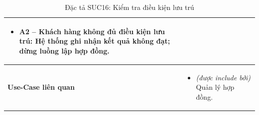 \begin{table}[H]
\begin{tabularx}{\textwidth}{|>{\centering\arraybackslash\bfseries}m{3.5cm}|X|}
\begin{itemize}[leftmargin=*, nosep, label=-]
        \item \textbf{A2 -- Khách hàng không đủ điều kiện lưu trú:} Hệ thống ghi nhận kết quả không đạt; dừng luồng lập hợp đồng.
    \end{itemize} \\
    \hline
    Use-Case liên quan &
    \begin{itemize}[leftmargin=*, nosep, label=-]
        \vspace{0.1cm}
        \item \textit{(được include bởi)} Quản lý hợp đồng.
\end{itemize} \\
    \hline
\end{tabularx}
\caption{Đặc tả SUC16: Kiểm tra điều kiện lưu trú}
\end{table}

\vspace{1cm}


